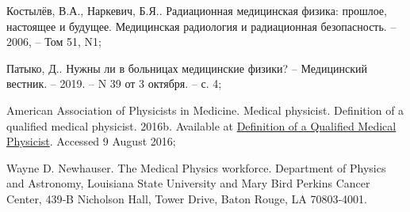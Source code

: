 \documentclass[a4paper,10pt]{extarticle}
\begin{document}
\begin{thebibliography}{99}
Костылёв, В.А., Наркевич, Б.Я.. Радиационная медицинская физика: прошлое, настоящее и будущее. Медицинская радиология и радиационная безопасность. -- 2006, --  Том 51, N1;

Патыко, Д.. Нужны ли в больницах медицинские физики? -- Медицинский вестник. -- 2019. -- N 39 от 3 октября. -- с. 4;

American Association of Physicists in Medicine. Medical physicist. Definition of a qualified medical physicist. 2016b. Available at \href{https://w3.aapm.org/medical_physicist/fields.php}{Definition of a Qualified Medical Physicist}. Accessed 9 August 2016;

Wayne D. Newhauser. The Medical Physics workforce. Department of Physics and Astronomy, Louisiana State University and Mary Bird Perkins Cancer Center, 439‐B Nicholson Hall, Tower Drive, Baton Rouge, LA 70803‐4001.

 

\end{thebibliography}

\end{document}
